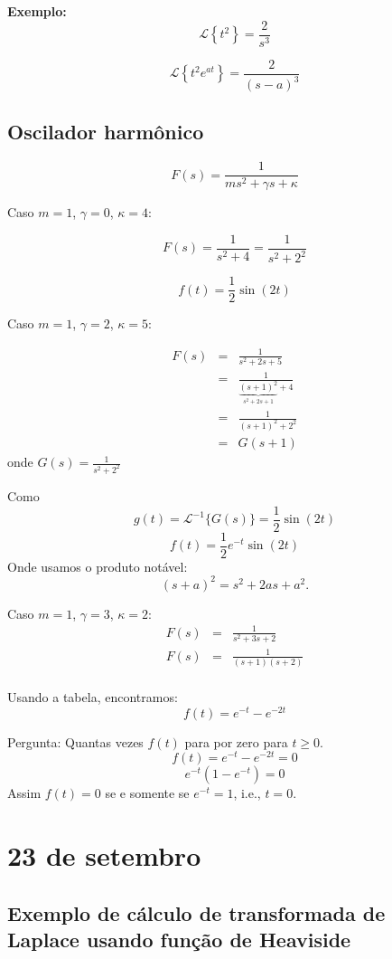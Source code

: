 \documentclass[a4paper,10pt]{book}
\begin{document}
{\bf Exemplo:}
$$\mathcal{L}\left\{t^2\right\}=\frac{2}{s^3}$$
   
$$\mathcal{L}\left\{t^2e^{at}\right\}=\frac{2}{(s-a)^3}$$
   
  \section{Oscilador harmônico}
$$F(s)=\frac{1}{ms^2+\gamma s+ \kappa}$$


Caso $m=1$, $\gamma=0$, $\kappa =4$:

$$F(s)=\frac{1}{s^2+ 4}=\frac{1}{s^2+ 2^2}$$

$$f(t)=\frac{1}{2}\sin(2t)$$

Caso $m=1$, $\gamma=2$, $\kappa =5$:

\begin{eqnarray*}F(s)&=&\frac{1}{s^2+2 s+ 5}\\
&=&\frac{1}{\underbrace{(s+1)^2}_{s^2+2s+1}+4}\\
&=&\frac{1}{(s+1)^2+2^2}\\
&=&G(s+1)
 \end{eqnarray*}
onde $G(s)=\frac{1}{s^2+2^2}$
 
 Como $$g(t)=\mathcal{L}^{-1}\{G(s)\}=\frac{1}{2}\sin(2t)$$ $$f(t)=\frac{1}{2}e^{-t}\sin(2t)$$
Onde usamos o produto notável: $$(s+a)^2=s^2+2as+a^2.$$
 
 Caso $m=1$, $\gamma=3$, $\kappa=2$:
\begin{eqnarray*}F(s)&=&\frac{1}{s^2+3 s+ 2}\\
F(s)&=&\frac{1}{(s+1)(s+2)}\\
 \end{eqnarray*}

 Usando a tabela, encontramos:
 $$f(t)=e^{-t}-e^{-2t}$$
 
 Pergunta: Quantas vezes $f(t)$ para por zero para $t\geq 0$.
 $$f(t)=e^{-t}-e^{-2t}=0$$
 $$e^{-t}(1-e^{-t})=0$$
  Assim $f(t)=0$ se e somente se $e^{-t}=1$, i.e., $t=0$.
  
  
  \chapter{23 de setembro}
  \section{Exemplo de cálculo de transformada de Laplace usando função de Heaviside}
  
\end{document}
